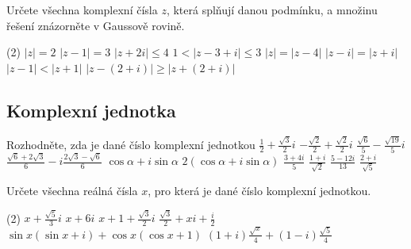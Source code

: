 \begin{exercise}{Určete všechna komplexní čísla $z$, která splňují danou podmínku, a množinu řešení znázorněte v Gaussově rovině.}
    \begin{tasks}(2)
        \task $|z|=2$
        \task $|z-1|=3$
        \task $|z+2i|\leq4$
        \task $1<|z-3+i|\leq3$
        \task $|z|=|z-4|$
        \task $|z-i|=|z+i|$
        \task $|z-1|<|z+1|$
        \task $|z-(2+i)|\geq|z+(2+i)|$
    \end{tasks}
\end{exercise}



\subsection*{Komplexní jednotka}

\begin{exerciseblock}[2]{Rozhodněte, zda je dané číslo komplexní jednotkou}
    \task $\displaystyle \frac12+\frac{\sqrt3}{2}i$
    \task $\displaystyle -\frac{\sqrt2}{2}+\frac{\sqrt2}{2}i$
    \task $\displaystyle \frac{\sqrt6}{5}-\frac{\sqrt{19}}5i$
    \task $\displaystyle \frac{\sqrt6+2\sqrt3}{6}-i\frac{2\sqrt3-\sqrt6}{6}$
    \task $\cos\alpha+i\sin\alpha$
    \task $2(\cos\alpha+i\sin\alpha)$
    \task $\displaystyle \frac{3+4i}{5}$
    \task $\displaystyle \frac{1+i}{\sqrt2}$
    \task $\displaystyle \frac{5-12i}{13}$
    \task $\displaystyle \frac{2+i}{\sqrt5}$
\end{exerciseblock}


\begin{exercise}{Určete všechna reálná čísla $x$, pro která je dané číslo komplexní jednotkou.}
    \begin{tasks}(2)
        \task $\displaystyle x+\frac{\sqrt5}{3}i$
        \task $x+6i$
        \task $\displaystyle x+1+\frac{\sqrt3}{2}i$
        \task $\displaystyle \frac{\sqrt3}{2}+xi+\frac{i}{2}$
        \task $\sin x(\sin x+i)+\cos x(\cos x+1)$
        \task $\displaystyle (1+i)\frac{\sqrt x}{4}+(1-i)\frac{\sqrt5}{4}$
    \end{tasks}
\end{exercise}



